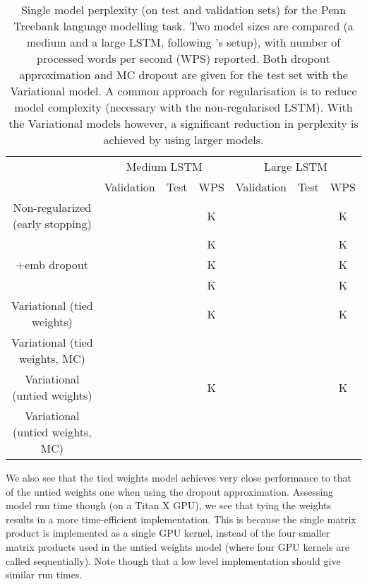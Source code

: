 \documentclass{article}
\theoremstyle{definition}
\begin{document}
\begin{table}[t!]
\center
\def\arraystretch{1.2}\hspace*{-3mm}
\tabcolsep=0.14cm
\begin{tabular}{c|ccc|ccc}
 & \multicolumn{3}{c}{\small Medium LSTM} & \multicolumn{3}{c}{\small Large LSTM} \\ 
 & Validation & Test & WPS & Validation & Test & WPS \\ 
\hline 
Non-regularized (early stopping) & 
 &  & K &  &  & K \\  
\citet{moon2015rnndrop} &  &  & K &  &  & K \\  
\citet{moon2015rnndrop} +emb dropout &  &  & K &  &  & K \\  
\citet{zaremba2014recurrent} &  &  & K &  &  & K \\  
\hline 
Variational (tied weights) &  &  & K &  &  & K \\  
Variational (tied weights, MC) &  &  &  &  &  &  \\  
Variational (untied weights) &  &  & K &  &  & K \\ 
Variational (untied weights, MC) &  &  &  &  &  &  \\  
\hline
\end{tabular}
\vspace{2mm}
\caption{Single model perplexity (on test and validation sets) for the Penn Treebank language modelling task. Two model sizes are compared (a medium and a large LSTM, following \citep{zaremba2014recurrent}'s setup), with number of processed words per second (WPS) reported. 
Both dropout approximation and MC dropout are given for the test set with the Variational model.
A common approach for regularisation 
is to reduce model complexity (necessary with the non-regularised LSTM).
With the Variational models however, a significant reduction in perplexity is achieved by using larger models. 
}
\label{table:LM}
\vspace{-9mm}
\end{table}





We also see that the tied weights model achieves very close performance to that of the untied weights one when using the dropout approximation. Assessing model run time though (on a Titan X GPU), we see that tying the weights results in a more time-efficient implementation. This is because the single matrix product is implemented as a single GPU kernel, instead of the four smaller matrix products used in the untied weights model (where four GPU kernels are called sequentially). Note though that a low level implementation should give similar run times.
\end{document}

